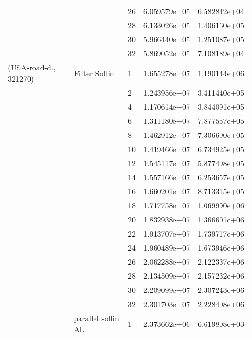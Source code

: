 \begin{tabular}{lllrr}
                      &                     & 26 &  6.059579e+05 &  6.582842e+04 \\
                      &                     & 28 &  6.133026e+05 &  1.406160e+05 \\
                      &                     & 30 &  5.966440e+05 &  1.251087e+05 \\
                      &                     & 32 &  5.869052e+05 &  7.108189e+04 \\
(USA-road-d., 321270) & Filter Sollin & 1  &  1.655278e+07 &  1.190144e+06 \\
                      &                     & 2  &  1.243956e+07 &  3.411440e+05 \\
                      &                     & 4  &  1.170614e+07 &  3.844091e+05 \\
                      &                     & 6  &  1.311180e+07 &  7.877557e+05 \\
                      &                     & 8  &  1.462912e+07 &  7.306690e+05 \\
                      &                     & 10 &  1.419466e+07 &  6.734925e+05 \\
                      &                     & 12 &  1.545117e+07 &  5.877498e+05 \\
                      &                     & 14 &  1.557166e+07 &  6.253657e+05 \\
                      &                     & 16 &  1.660201e+07 &  8.713315e+05 \\
                      &                     & 18 &  1.717758e+07 &  1.069990e+06 \\
                      &                     & 20 &  1.832938e+07 &  1.366601e+06 \\
                      &                     & 22 &  1.913707e+07 &  1.739717e+06 \\
                      &                     & 24 &  1.960489e+07 &  1.673946e+06 \\
                      &                     & 26 &  2.062288e+07 &  2.122337e+06 \\
                      &                     & 28 &  2.134509e+07 &  2.157232e+06 \\
                      &                     & 30 &  2.209099e+07 &  2.307243e+06 \\
                      &                     & 32 &  2.301703e+07 &  2.228408e+06 \\
                      & parallel sollin AL & 1  &  2.373662e+06 &  6.619808e+03 \\

\end{tabular}
